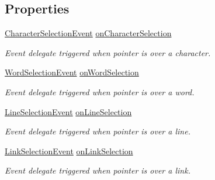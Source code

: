 \subsection*{Properties}
\begin{DoxyCompactItemize}
\item 
\hyperlink{class_t_m_pro_1_1_t_m_p___text_event_handler_1_1_character_selection_event}{Character\+Selection\+Event} \hyperlink{class_t_m_pro_1_1_t_m_p___text_event_handler_adf246c6977702948b7ab987f34bf12a2}{on\+Character\+Selection}
\begin{DoxyCompactList}\small\item\em Event delegate triggered when pointer is over a character. \end{DoxyCompactList}\item 
\hyperlink{class_t_m_pro_1_1_t_m_p___text_event_handler_1_1_word_selection_event}{Word\+Selection\+Event} \hyperlink{class_t_m_pro_1_1_t_m_p___text_event_handler_aaba688a88f61b13eecf99e05725e6985}{on\+Word\+Selection}
\begin{DoxyCompactList}\small\item\em Event delegate triggered when pointer is over a word. \end{DoxyCompactList}\item 
\hyperlink{class_t_m_pro_1_1_t_m_p___text_event_handler_1_1_line_selection_event}{Line\+Selection\+Event} \hyperlink{class_t_m_pro_1_1_t_m_p___text_event_handler_ae13d515549d0908bfaabb435239b59b0}{on\+Line\+Selection}
\begin{DoxyCompactList}\small\item\em Event delegate triggered when pointer is over a line. \end{DoxyCompactList}\item 
\hyperlink{class_t_m_pro_1_1_t_m_p___text_event_handler_1_1_link_selection_event}{Link\+Selection\+Event} \hyperlink{class_t_m_pro_1_1_t_m_p___text_event_handler_aa2b47e6e7e685896cf95aa7386f8ab18}{on\+Link\+Selection}
\begin{DoxyCompactList}\small\item\em Event delegate triggered when pointer is over a link. \end{DoxyCompactList}\end{DoxyCompactItemize}
